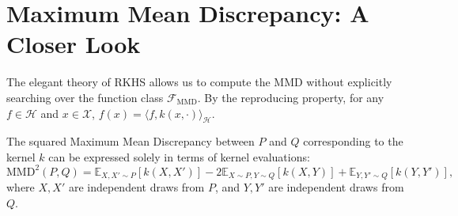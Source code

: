 \section{Maximum Mean Discrepancy: A Closer Look}

The elegant theory of RKHS allows us to compute the MMD without explicitly searching over the function class $\mathcal{F}_{\text{MMD}}$. By the reproducing property, for any $f \in \mathcal{H}$ and $x \in \mathcal{X}$, $f(x) = \langle f, k(x, \cdot) \rangle_{\mathcal{H}}$.

\begin{theorem}
\label{thm:mmd_closed_form}
The squared Maximum Mean Discrepancy between $P$ and $Q$ corresponding to the kernel $k$ can be expressed solely in terms of kernel evaluations:
\begin{equation}
    \text{MMD}^2(P, Q) = \mathbb{E}_{X, X' \sim P}[k(X, X')] - 2\mathbb{E}_{X \sim P, Y \sim Q}[k(X, Y)] + \mathbb{E}_{Y, Y' \sim Q}[k(Y, Y')],
\end{equation}
where $X, X'$ are independent draws from $P$, and $Y, Y'$ are independent draws from $Q$.
\end{theorem}

